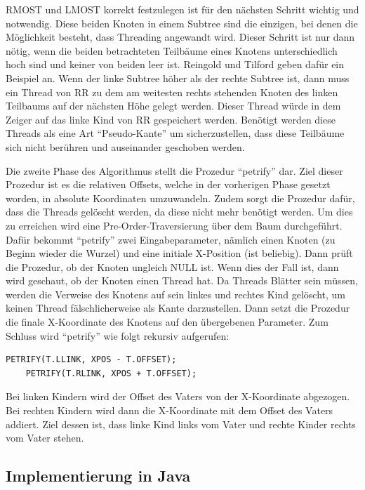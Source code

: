 RMOST und LMOST korrekt festzulegen ist für den nächsten Schritt wichtig und notwendig. Diese beiden Knoten in einem Subtree 
sind die einzigen, bei denen die Möglichkeit besteht, dass Threading angewandt wird. Dieser Schritt ist nur dann nötig, wenn 
die beiden betrachteten Teilbäume eines Knotens unterschiedlich hoch sind und keiner von beiden leer ist. Reingold und Tilford 
geben dafür ein Beispiel an. Wenn der linke Subtree höher als der rechte Subtree ist, dann muss ein Thread von \ac{RR} zu dem am weitesten 
rechts stehenden Knoten des linken Teilbaums auf der nächsten Höhe gelegt werden. Dieser Thread würde in dem Zeiger auf das linke Kind 
von \ac{RR} gespeichert werden. Benötigt werden diese Threads als eine Art “Pseudo-Kante” um sicherzustellen, dass diese Teilbäume sich 
nicht berühren und auseinander geschoben werden.

Die zweite Phase des Algorithmus stellt die Prozedur “petrify” dar. Ziel dieser Prozedur ist es die relativen Offsets, 
welche in der vorherigen Phase gesetzt worden, in absolute Koordinaten umzuwandeln. Zudem sorgt die Prozedur dafür, dass die Threads 
gelöscht werden, da diese nicht mehr benötigt werden. Um dies zu erreichen wird eine Pre-Order-Traversierung 
über dem Baum durchgeführt. Dafür bekommt “petrify” zwei Eingabeparameter, nämlich einen Knoten (zu Beginn wieder die Wurzel) und eine 
initiale X-Position (ist beliebig). Dann prüft die Prozedur, ob der Knoten ungleich NULL ist. Wenn dies der Fall ist, dann wird geschaut, 
ob der Knoten einen Thread hat. Da Threads Blätter sein müssen, werden die Verweise des Knotens auf sein linkes und rechtes Kind gelöscht, 
um keinen Thread fälschlicherweise als Kante darzustellen. Dann setzt die Prozedur die finale X-Koordinate des Knotens auf den 
übergebenen Parameter. Zum Schluss wird “petrify” wie folgt rekursiv aufgerufen:

\begin{lstlisting}[caption=Rekursiver Aufruf von Petrify (Pre-Order)]
    PETRIFY(T.LLINK, XPOS - T.OFFSET);
    PETRIFY(T.RLINK, XPOS + T.OFFSET);
\end{lstlisting}

Bei linken Kindern wird der Offset des Vaters von der X-Koordinate abgezogen. Bei rechten Kindern wird dann die X-Koordinate mit dem 
Offset des Vaters addiert. Ziel dessen ist, dass linke Kind links vom Vater und rechte Kinder rechts vom Vater stehen.


\subsection{Implementierung in Java}

